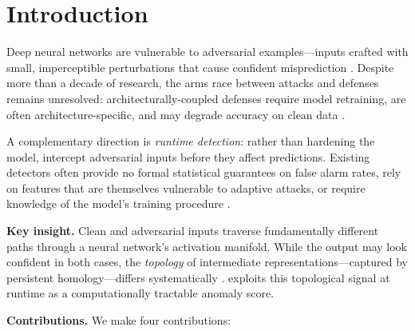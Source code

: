 \section{Introduction}
\label{sec:intro}

Deep neural networks are vulnerable to adversarial examples---inputs crafted 
with small, imperceptible perturbations that cause confident misprediction 
\cite{szegedy2014intriguing,goodfellow2015explaining}.
Despite more than a decade of research, the arms race between attacks and 
defenses remains unresolved: architecturally-coupled defenses require model 
retraining, are often architecture-specific, and may degrade accuracy on clean 
data \cite{croce2020reliable,athalye2018obfuscated}.

A complementary direction is \emph{runtime detection}: rather than hardening 
the model, intercept adversarial inputs before they affect predictions.
Existing detectors often provide no formal statistical guarantees on false 
alarm rates, rely on features that are themselves vulnerable to adaptive 
attacks, or require knowledge of the model's training procedure 
\cite{ma2018characterizing,grosse2017statistical,lee2018simple}.

\textbf{Key insight.} 
Clean and adversarial inputs traverse fundamentally different paths through 
a neural network's activation manifold.
While the output may look confident in both cases, the \emph{topology} of 
intermediate representations---captured by persistent homology---differs 
systematically \cite{gebhart2019adversary,carlini2019evaluating}.
\prism exploits this topological signal at runtime as a 
computationally tractable anomaly score.

\textbf{Contributions.}
We make four contributions:

